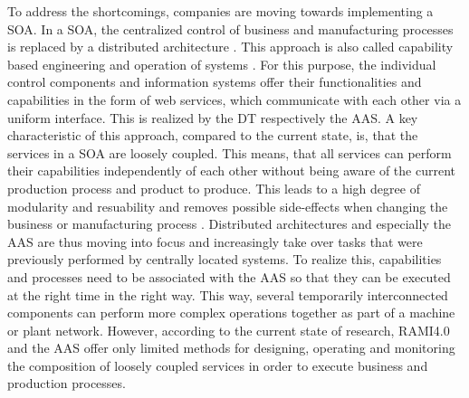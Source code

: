 To address the shortcomings, companies are moving towards implementing a \ac{SOA}. In a \ac{SOA}, the centralized control of business and manufacturing processes is replaced by a distributed architecture \cite[p.861]{Uslander2015ReferenceApproach}. This approach is also called capability based engineering and operation of systems \cite[p.5]{Bayha2020DescribingComponents}. For this purpose, the individual control components and information systems offer their functionalities and capabilities in the form of web services, which communicate with each other via a uniform interface. This is realized by the \ac{DT} respectively the \ac{AAS}. A key characteristic of this approach, compared to the current state, is, that the services in a \ac{SOA} are loosely coupled. This means, that all services can perform their capabilities independently of each other without being aware of the current production process and product to produce. This leads to a high degree of modularity and resuability and removes possible side-effects when changing the business or manufacturing process \cite[p.491]{Schicke2020EnablingTwins}. Distributed architectures and especially the \ac{AAS} are thus moving into focus and increasingly take over tasks that were previously performed by centrally located systems. To realize this, capabilities and processes need to be associated with the \ac{AAS} so that they can be executed at the right time in the right way. This way, several temporarily interconnected components can perform more complex operations together as part of a machine or plant network. However, according to the current state of research, \ac{RAMI4.0} and the \ac{AAS} offer only limited methods for designing, operating and monitoring the composition of loosely coupled services in order to execute business and production processes. 

